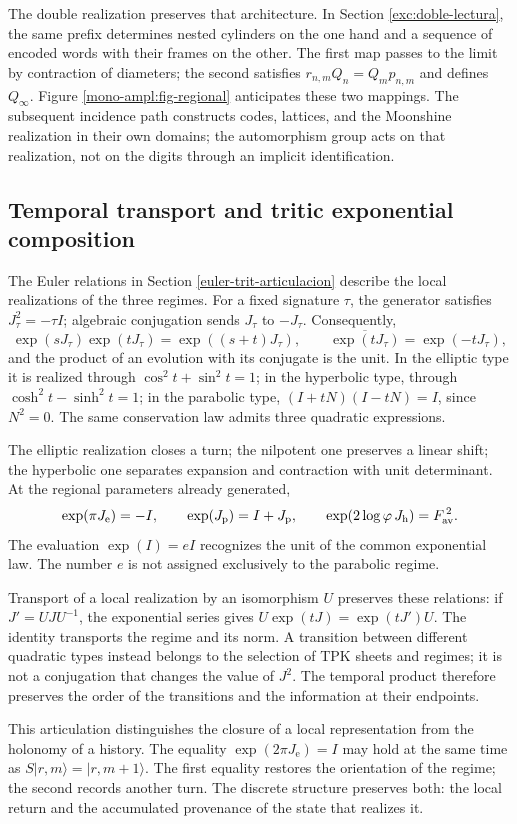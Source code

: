 The double realization preserves that architecture. In Section
\ref{exc:doble-lectura}, the same prefix determines nested cylinders on the
one hand and a sequence of encoded words with their frames on the other.
The first map passes to the limit by contraction of diameters; the second
satisfies \(r_{n,m}Q_n=Q_mp_{n,m}\) and defines \(Q_\infty\).
Figure \ref{mono-ampl:fig-regional} anticipates these two mappings.
The subsequent incidence path constructs codes, lattices, and the Moonshine
realization in their own domains; the automorphism group acts on that
realization, not on the digits through an implicit identification.





\subsection{Temporal transport and tritic exponential composition}
\label{mono-ampl:euler}

The Euler relations in Section \ref{euler-trit-articulacion}
describe the local realizations of the three regimes. For a fixed signature
\(\tau\), the generator satisfies \(J_\tau^2=-\tau I\); algebraic
conjugation sends \(J_\tau\) to \(-J_\tau\). Consequently,
\[
 \exp(sJ_\tau)\exp(tJ_\tau)=\exp((s+t)J_\tau),\qquad
 \overline{\exp(tJ_\tau)}=\exp(-tJ_\tau),
\]
and the product of an evolution with its conjugate is the unit. In the
elliptic type it is realized through \(\cos^2t+\sin^2t=1\); in the
hyperbolic type, through \(\cosh^2t-\sinh^2t=1\); in the parabolic type,
\((I+tN)(I-tN)=I\), since \(N^2=0\). The same conservation law admits
three quadratic expressions.

The elliptic realization closes a turn; the nilpotent one preserves a linear
shift; the hyperbolic one separates expansion and contraction with unit
determinant. At the regional parameters already generated,
\[
 \exp(\pi J_{\mathrm e})=-I,\qquad
 \exp(J_{\mathrm p})=I+J_{\mathrm p},\qquad
 \exp(2\log\varphi\,J_{\mathrm h})=F_{\rm av}^{\,2}.
\]
The evaluation \(\exp(I)=eI\) recognizes the unit of the common exponential
law. The number \(e\) is not assigned exclusively to the parabolic regime.

Transport of a local realization by an isomorphism \(U\) preserves these
relations: if \(J'=UJU^{-1}\), the exponential series gives
\(U\exp(tJ)=\exp(tJ')U\). The identity transports the regime and its
norm. A transition between different quadratic types instead belongs to the
selection of TPK sheets and regimes; it is not a conjugation that changes
the value of \(J^2\). The temporal product therefore preserves the order of
the transitions and the information at their endpoints.

This articulation distinguishes the closure of a local representation from
the holonomy of a history. The equality \(\exp(2\pi J_{\mathrm e})=I\)
may hold at the same time as \(S|r,m\rangle=|r,m+1\rangle\). The first
equality restores the orientation of the regime; the second records another
turn. The discrete structure preserves both: the local return and the
accumulated provenance of the state that realizes it.
